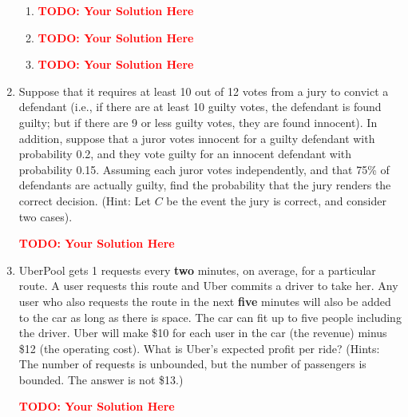 \documentclass[12pt]{article}
\def\todo#1{\textcolor{red}{\textbf{#1}}}
\renewcommand{\|}{\mid}
\begin{document}
\begin{enumerate}
\begin{tcolorbox}
\begin{enumerate}
\item \todo{TODO: Your Solution Here}
\item \todo{TODO: Your Solution Here}
\item \todo{TODO: Your Solution Here}
\end{enumerate}
\end{tcolorbox}

\item Suppose that it requires at least 10 out of 12 votes from a jury to convict a defendant (i.e., if there are at least 10 guilty votes, the defendant is found guilty; but if there are 9 or less guilty votes, they are found innocent). In addition, suppose that a juror votes innocent for a guilty defendant with probability 0.2, and they vote guilty for an innocent defendant with probability 0.15. Assuming each juror votes independently, and that 75\% of defendants are actually guilty, find the probability that the jury renders the correct decision. (Hint: Let $C$ be the event the jury is correct, and consider two cases).

\begin{tcolorbox}
\todo{TODO: Your Solution Here}
\end{tcolorbox}

\item UberPool gets 1 requests every \textbf{two} minutes, on average, for a particular route. A user requests this route and Uber commits a driver to take her. Any user who also requests the route in the next \textbf{five} minutes will also be added to the car as long as there is space.  The car can fit up to five people including the driver.
Uber will make \$10 for each user in the car (the revenue) minus \$12 (the operating cost). What is Uber's expected profit per ride? (Hints: The number of requests is unbounded, but the number of passengers is bounded. The answer is not \$13.)

\begin{tcolorbox}
\todo{TODO: Your Solution Here}
\end{tcolorbox}


\end{enumerate}
\end{document}
